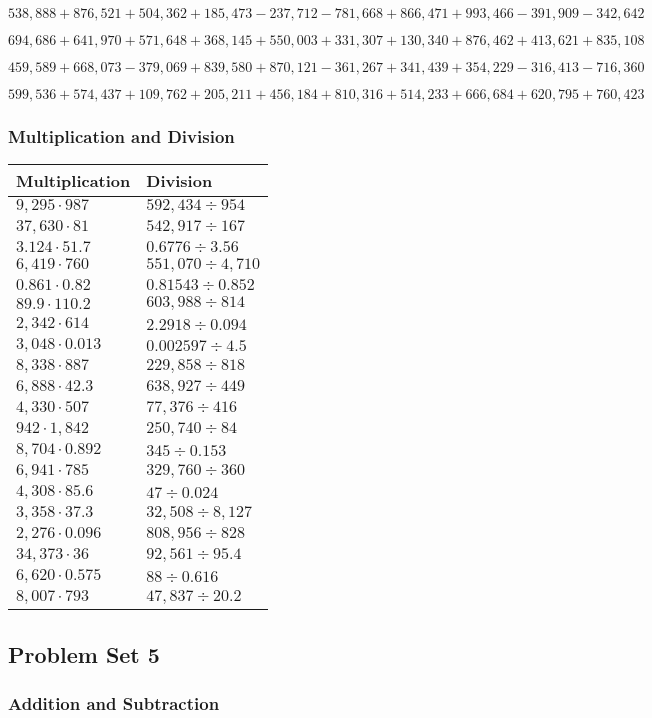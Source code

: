 \(538,888+876,521+504,362+185,473-237,712-781,668+866,471+993,466-391,909-342,642\)

\(694,686+641,970+571,648+368,145+550,003+331,307+130,340+876,462+413,621+835,108\)

\(459,589+668,073-379,069+839,580+870,121-361,267+341,439+354,229-316,413-716,360\)

\(599,536+574,437+109,762+205,211+456,184+810,316+514,233+666,684+620,795+760,423\)

\hypertarget{multiplication-and-division-308}{%
\subsubsection{Multiplication and
Division}\label{multiplication-and-division-308}}

\begin{longtable}[]{@{}ll@{}}
\toprule
Multiplication & Division\tabularnewline
\midrule
\endhead
\(9,295\cdot987\) & \(592,434÷954\)\tabularnewline
\(37,630\cdot81\) & \(542,917÷167\)\tabularnewline
\(3.124\cdot51.7\) & \(0.6776÷3.56\)\tabularnewline
\(6,419\cdot760\) & \(551,070÷4,710\)\tabularnewline
\(0.861\cdot0.82\) & \(0.81543÷0.852\)\tabularnewline
\(89.9\cdot110.2\) & \(603,988÷814\)\tabularnewline
\(2,342\cdot614\) & \(2.2918÷0.094\)\tabularnewline
\(3,048\cdot0.013\) & \(0.002597÷4.5\)\tabularnewline
\(8,338\cdot887\) & \(229,858÷818\)\tabularnewline
\(6,888\cdot42.3\) & \(638,927÷449\)\tabularnewline
\(4,330\cdot507\) & \(77,376÷416\)\tabularnewline
\(942\cdot1,842\) & \(250,740÷84\)\tabularnewline
\(8,704\cdot0.892\) & \(345÷0.153\)\tabularnewline
\(6,941\cdot785\) & \(329,760÷360\)\tabularnewline
\(4,308\cdot85.6\) & \(47÷0.024\)\tabularnewline
\(3,358\cdot37.3\) & \(32,508÷8,127\)\tabularnewline
\(2,276\cdot0.096\) & \(808,956÷828\)\tabularnewline
\(34,373\cdot36\) & \(92,561÷95.4\)\tabularnewline
\(6,620\cdot0.575\) & \(88÷0.616\)\tabularnewline
\(8,007\cdot793\) & \(47,837÷20.2\)\tabularnewline
\bottomrule
\end{longtable}

\hypertarget{problem-set-5-5}{%
\subsection{Problem Set 5}\label{problem-set-5-5}}

\hypertarget{addition-and-subtraction-310}{%
\subsubsection{Addition and
Subtraction}\label{addition-and-subtraction-310}}

